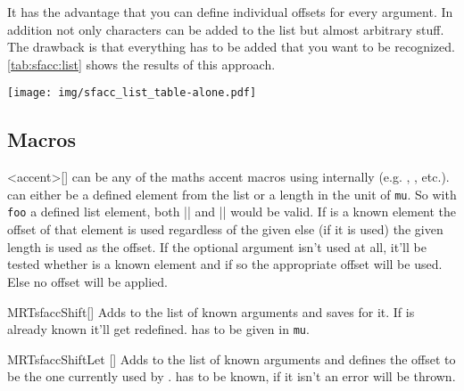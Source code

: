 It has the advantage that you can define individual offsets for every argument.
In addition not only characters can be added to the list but almost arbitrary
stuff. The drawback is that everything has to be added that you want to be
recognized.
\autoref{tab:sfacc:list} shows the results of this approach.

\begin{MRTtable}%
  [
    ,env={}
    ,label=tab:sfacc:list
    ,caption=
      {%
        Comparison of shifted accents against original placement with the use of
        the \opt{list} variant.%
      }%
  ]
  \texttt{[image: img/sfacc\_list\_table-alone.pdf]}
\end{MRTtable}%

\subsection{Macros}
\begin{describemacro}{<accent>}[]%
   can be any of the maths accent macros using 
  internally (e.g. , , etc.).\\
   can either be a defined element from the list or a length in the
  unit of \texttt{mu}. So with \texttt{foo} a defined list element, both
  \bverb|| and \bverb|| would be valid. If
   is a known element the offset of that element is used regardless of
  the given  else (if it is used) the given length is used as the
  offset. If the optional argument isn't used at all, it'll be tested whether
   is a known element and if so the appropriate offset will be used.
  Else no offset will be applied.
\end{describemacro}%

\begin{describemacro}{MRTsfaccShift}[]%
  Adds  to the list of known arguments and saves  for
  it. If  is already known it'll get redefined.  has
  to be given in \texttt{mu}.
\end{describemacro}%

\begin{describemacro}{MRTsfaccShiftLet}%
  []
  Adds  to the list of known arguments and defines the
  offset to be the one currently used by .
   has to be known, if it isn't an error will be thrown.
\end{describemacro}%

